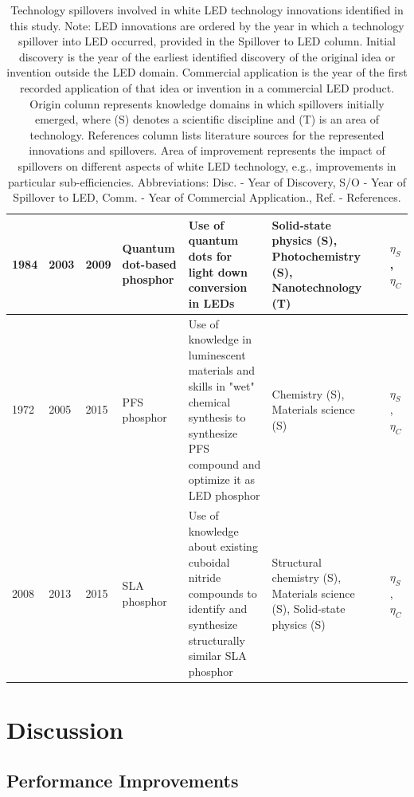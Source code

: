 \documentclass[twoside,twocolumn,9pt]{article}
\begin{document}
\begin{table}[h]
\begin{tabularx}{\textwidth}{|l|l|l|X|X|X|l|X|}
        1984 & 2003 & 2009 & Quantum dot-based phosphor & Use of quantum dots for light down conversion in LEDs & Solid-state physics (S), Photochemistry (S), Nanotechnology (T) &\cite{fojtik1984photo}\cite{simmonsfinal}\cite{ledprof_nexxusqd}\cite{bourzac2013quantum} & $\eta_S$, $\eta_C$ \\ \hline
        1972 & 2005 & 2015 & PFS phosphor & Use of knowledge in luminescent materials and skills in "wet" chemical synthesis to synthesize PFS compound and optimize it as LED phosphor & Chemistry (S), Materials science (S) &\cite{paulusz1973efficient}\cite{radkov2009red}\cite{Murphy2015} & $\eta_S$, $\eta_C$ \\ \hline
        2008 & 2013 & 2015 & SLA phosphor & Use of knowledge about existing cuboidal nitride compounds to identify and synthesize structurally similar SLA phosphor & Structural chemistry (S), Materials science (S), Solid-state physics (S) &\cite{Park2008New}\cite{schmidt2013new}\cite{Pust2014} & $\eta_S$, $\eta_C$ \\ \hline
    \end{tabularx}
    \caption{Technology spillovers involved in white LED technology innovations identified in this study. Note: LED innovations are ordered by the year in which a technology spillover into LED occurred, provided in the Spillover to LED column. Initial discovery is the year of the earliest identified discovery of the original idea or invention outside the LED domain. Commercial application is the year of the first recorded application of that idea or invention in a commercial LED product. Origin column represents knowledge domains in which spillovers initially emerged, where (S) denotes a scientific discipline and (T) is an area of technology. References column lists literature sources for the represented innovations and spillovers. Area of improvement represents the impact of spillovers on different aspects of white LED technology, e.g., improvements in particular sub-efficiencies. Abbreviations: Disc. - Year of Discovery, S/O - Year of Spillover to LED, Comm. - Year of Commercial Application., Ref. - References.}
    \label{tab:spillovers}
\end{table}

\section{Discussion}

\subsection{Performance Improvements}
\end{document}
